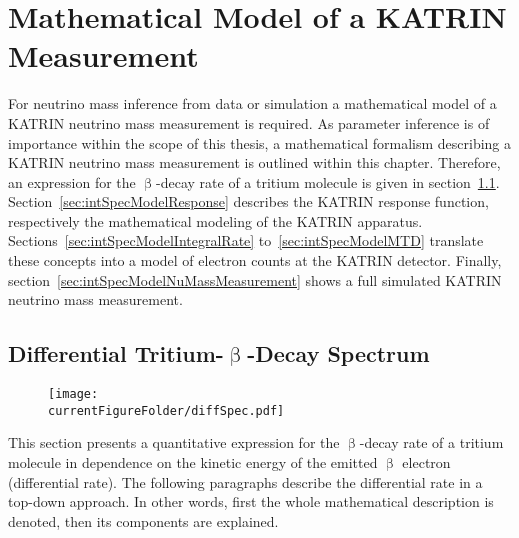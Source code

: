 \def\currentRootFolder{chapter/modelOfIntegratedRate}
\def\currentFigureFolder{\currentRootFolder/fig}



\chapter{Mathematical Model of a KATRIN Measurement}
\label{sec:intSpecModel}
For neutrino mass inference from data or simulation a mathematical model of a KATRIN neutrino mass measurement is required. As parameter inference is of importance within the scope of this thesis, a mathematical formalism describing a KATRIN neutrino mass measurement is outlined within this chapter. Therefore, an expression for the $\upbeta$-decay rate of a tritium molecule is given in section~\ref{sec:intSpecModelDiffSpec}. Section~\ref{sec:intSpecModelResponse} describes the KATRIN response function, respectively the mathematical modeling of the KATRIN apparatus. Sections~\ref{sec:intSpecModelIntegralRate} to~\ref{sec:intSpecModelMTD} translate these concepts into a model of electron counts at the KATRIN detector. Finally, section~\ref{sec:intSpecModelNuMassMeasurement} shows a full simulated KATRIN neutrino mass measurement.

\section{Differential Tritium-\texorpdfstring{$\upbeta$}{Beta}-Decay Spectrum}
\label{sec:intSpecModelDiffSpec}
\begin{figure}
	\centering
	\texttt{[image: \\currentFigureFolder/diffSpec.pdf]}
	\label{fig:intSpecModelDiffSpec}
\end{figure}


This section presents a quantitative expression for the $\upbeta$-decay rate of a tritium molecule in dependence on the kinetic energy of the emitted $\upbeta$ electron (differential rate). The following paragraphs describe the differential rate in a top-down approach. In other words, first the whole mathematical description is denoted, then its components are explained.

